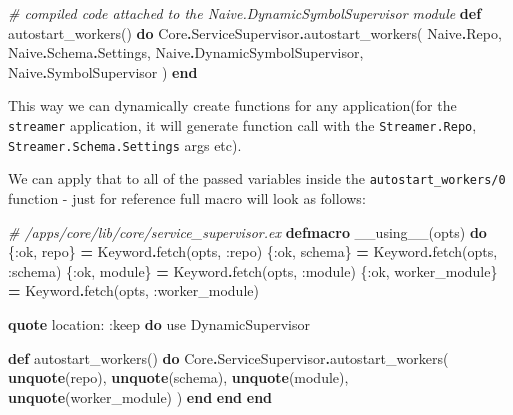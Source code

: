 \documentclass[
  oneside]{book}
\newenvironment{Shaded}{\begin{snugshade}}{\end{snugshade}}
\newcommand{\CommentTok}[1]{\textcolor[rgb]{0.56,0.35,0.01}{\textit{#1}}}
\newcommand{\ConstantTok}[1]{\textcolor[rgb]{0.00,0.00,0.00}{#1}}
\newcommand{\ImportTok}[1]{#1}
\newcommand{\KeywordTok}[1]{\textcolor[rgb]{0.13,0.29,0.53}{\textbf{#1}}}
\newcommand{\NormalTok}[1]{#1}
\newcommand{\OperatorTok}[1]{\textcolor[rgb]{0.81,0.36,0.00}{\textbf{#1}}}
\newcommand{\VariableTok}[1]{\textcolor[rgb]{0.00,0.00,0.00}{#1}}
\begin{document}
\begin{Shaded}
\begin{Highlighting}[]
    \CommentTok{\# compiled code attached to the \textasciigrave{}Naive.DynamicSymbolSupervisor\textasciigrave{} module}
    \KeywordTok{def}\NormalTok{ autostart\_workers() }\KeywordTok{do}
      \ConstantTok{Core}\OperatorTok{.}\ConstantTok{ServiceSupervisor}\OperatorTok{.}\NormalTok{autostart\_workers(}
        \ConstantTok{Naive}\OperatorTok{.}\ConstantTok{Repo}\NormalTok{,}
        \ConstantTok{Naive}\OperatorTok{.}\ConstantTok{Schema}\OperatorTok{.}\ConstantTok{Settings}\NormalTok{,}
        \ConstantTok{Naive}\OperatorTok{.}\ConstantTok{DynamicSymbolSupervisor}\NormalTok{,}
        \ConstantTok{Naive}\OperatorTok{.}\ConstantTok{SymbolSupervisor}
\NormalTok{      )}
    \KeywordTok{end}
\end{Highlighting}
\end{Shaded}

This way we can dynamically create functions for any application(for the \texttt{streamer} application, it will generate function call with the \texttt{Streamer.Repo}, \texttt{Streamer.Schema.Settings} args etc).

We can apply that to all of the passed variables inside the \texttt{autostart\_workers/0} function - just for reference full macro will look as follows:

\begin{Shaded}
\begin{Highlighting}[]
  \CommentTok{\# /apps/core/lib/core/service\_supervisor.ex}
  \KeywordTok{defmacro}\NormalTok{ \_\_using\_\_(opts) }\KeywordTok{do}
\NormalTok{    \{}\VariableTok{:ok}\NormalTok{, repo\} }\OperatorTok{=} \ConstantTok{Keyword}\OperatorTok{.}\NormalTok{fetch(opts, }\VariableTok{:repo}\NormalTok{)}
\NormalTok{    \{}\VariableTok{:ok}\NormalTok{, schema\} }\OperatorTok{=} \ConstantTok{Keyword}\OperatorTok{.}\NormalTok{fetch(opts, }\VariableTok{:schema}\NormalTok{)}
\NormalTok{    \{}\VariableTok{:ok}\NormalTok{, module\} }\OperatorTok{=} \ConstantTok{Keyword}\OperatorTok{.}\NormalTok{fetch(opts, }\VariableTok{:module}\NormalTok{)}
\NormalTok{    \{}\VariableTok{:ok}\NormalTok{, worker\_module\} }\OperatorTok{=} \ConstantTok{Keyword}\OperatorTok{.}\NormalTok{fetch(opts, }\VariableTok{:worker\_module}\NormalTok{)}

    \KeywordTok{quote} \VariableTok{location:} \VariableTok{:keep} \KeywordTok{do}
      \ImportTok{use} \ConstantTok{DynamicSupervisor}

      \KeywordTok{def}\NormalTok{ autostart\_workers() }\KeywordTok{do}
        \ConstantTok{Core}\OperatorTok{.}\ConstantTok{ServiceSupervisor}\OperatorTok{.}\NormalTok{autostart\_workers(}
          \KeywordTok{unquote}\NormalTok{(repo),}
          \KeywordTok{unquote}\NormalTok{(schema),}
          \KeywordTok{unquote}\NormalTok{(module),}
          \KeywordTok{unquote}\NormalTok{(worker\_module)}
\NormalTok{        )}
      \KeywordTok{end}
    \KeywordTok{end}
  \KeywordTok{end}
\end{Highlighting}
\end{Shaded}
\end{document}

